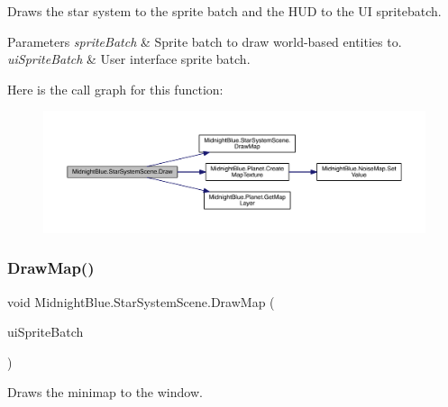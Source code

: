 Draws the star system to the sprite batch and the H\+UD to the UI spritebatch. 


\begin{DoxyParams}{Parameters}
{\em sprite\+Batch} & Sprite batch to draw world-\/based entities to.\\
\hline
{\em ui\+Sprite\+Batch} & User interface sprite batch.\\
\hline
\end{DoxyParams}
Here is the call graph for this function\+:
\nopagebreak
\begin{figure}[H]
\begin{center}
\leavevmode
\includegraphics[width=350pt]{class_midnight_blue_1_1_star_system_scene_ac3d90fb8d914d15b912f5da3cc1aa8a0_cgraph}
\end{center}
\end{figure}
\hypertarget{class_midnight_blue_1_1_star_system_scene_a8ce5e552f65d43e0326644e069dc6c24}{}\label{class_midnight_blue_1_1_star_system_scene_a8ce5e552f65d43e0326644e069dc6c24} 
\subsubsection{\texorpdfstring{Draw\+Map()}{DrawMap()}}
{\footnotesize\ttfamily void Midnight\+Blue.\+Star\+System\+Scene.\+Draw\+Map (\begin{DoxyParamCaption}\item[{Sprite\+Batch}]{ui\+Sprite\+Batch }\end{DoxyParamCaption})\hspace{0.3cm}{\ttfamily [inline]}}



Draws the minimap to the window. 


